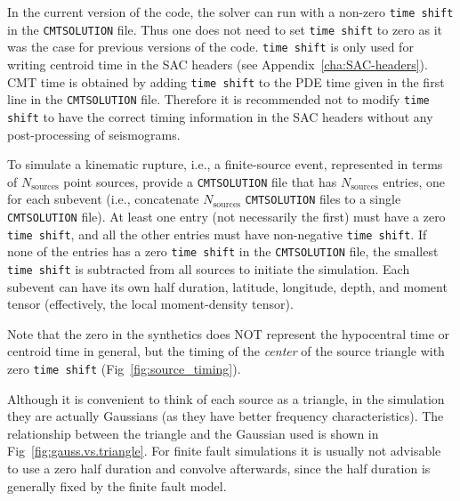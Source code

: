 \documentclass[oneside,english]{book}
\begin{document}
In the current version of the code, the solver can run with a non-zero \texttt{time shift} in the \texttt{CMTSOLUTION} file. Thus one does not need to set \texttt{time shift} to zero as it was the case for previous versions of the code. \texttt{time shift} is only used for writing centroid time in the SAC headers (see Appendix~\ref{cha:SAC-headers}). CMT time is obtained by adding \texttt{time shift} to the PDE time given in the first line in the \texttt{CMTSOLUTION} file. Therefore it is recommended not to modify \texttt{time shift} to have the correct timing information in the SAC headers without any post-processing of seismograms.

\label{To-simulate-a}To simulate a kinematic rupture, i.e., a finite-source
event, represented in terms of $N_{\mathrm{sources}}$ point sources,
provide a \texttt{CMTSOLUTION} file that has $N_{\mathrm{sources}}$
entries, one for each subevent (i.e., concatenate $N_{\mathrm{sources}}$
\texttt{CMTSOLUTION} files to a single \texttt{CMTSOLUTION} file).
At least one entry (not necessarily the first) must have a zero \texttt{time
shift}, and all the other entries must have non-negative \texttt{time
shift}. If none of the entries has a zero \texttt{time shift} in the \texttt{CMTSOLUTION} file, the smallest \texttt{time shift} is subtracted from all sources to initiate the simulation. Each subevent can have its own half duration, latitude, longitude,
depth, and moment tensor (effectively, the local moment-density tensor).

Note that the zero in the synthetics does NOT represent the hypocentral
time or centroid time in general, but the timing of the \textit{center}
of the source triangle with zero \texttt{time shift} (Fig~\ref{fig:source_timing}).

Although it is convenient to think of each source as a triangle, in
the simulation they are actually Gaussians (as they have better frequency
characteristics). The relationship between the triangle and the Gaussian
used is shown in Fig~\ref{fig:gauss.vs.triangle}. For finite fault
simulations it is usually not advisable to use a zero half duration
and convolve afterwards, since the half duration is generally fixed
by the finite fault model.
\end{document}
